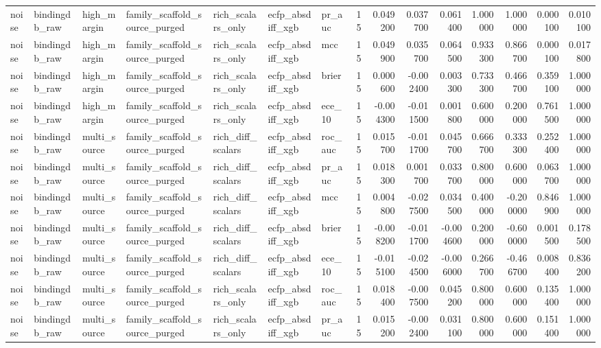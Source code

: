 \begin{longtable}{lllllllrrrrrrrr}
noise & bindingdb\_raw & high\_margin & family\_scaffold\_source\_purged & rich\_scalars\_only & ecfp\_absdiff\_xgb & pr\_auc & 15 & 0.049200 & 0.037700 & 0.061400 & 1.000000 & 1.000000 & 0.000100 & 0.010100 \\
noise & bindingdb\_raw & high\_margin & family\_scaffold\_source\_purged & rich\_scalars\_only & ecfp\_absdiff\_xgb & mcc & 15 & 0.049900 & 0.035700 & 0.064500 & 0.933300 & 0.866700 & 0.000100 & 0.017800 \\
noise & bindingdb\_raw & high\_margin & family\_scaffold\_source\_purged & rich\_scalars\_only & ecfp\_absdiff\_xgb & brier & 15 & 0.000600 & -0.002400 & 0.003300 & 0.733300 & 0.466700 & 0.359100 & 1.000000 \\
noise & bindingdb\_raw & high\_margin & family\_scaffold\_source\_purged & rich\_scalars\_only & ecfp\_absdiff\_xgb & ece\_10 & 15 & -0.004300 & -0.011500 & 0.001800 & 0.600000 & 0.200000 & 0.761500 & 1.000000 \\
noise & bindingdb\_raw & multi\_source & family\_scaffold\_source\_purged & rich\_diff\_scalars & ecfp\_absdiff\_xgb & roc\_auc & 15 & 0.015700 & -0.011700 & 0.045700 & 0.666700 & 0.333300 & 0.252400 & 1.000000 \\
noise & bindingdb\_raw & multi\_source & family\_scaffold\_source\_purged & rich\_diff\_scalars & ecfp\_absdiff\_xgb & pr\_auc & 15 & 0.018300 & 0.001700 & 0.033700 & 0.800000 & 0.600000 & 0.063700 & 1.000000 \\
noise & bindingdb\_raw & multi\_source & family\_scaffold\_source\_purged & rich\_diff\_scalars & ecfp\_absdiff\_xgb & mcc & 15 & 0.004800 & -0.027500 & 0.034500 & 0.400000 & -0.200000 & 0.846900 & 1.000000 \\
noise & bindingdb\_raw & multi\_source & family\_scaffold\_source\_purged & rich\_diff\_scalars & ecfp\_absdiff\_xgb & brier & 15 & -0.008200 & -0.011700 & -0.004600 & 0.200000 & -0.600000 & 0.001500 & 0.178500 \\
noise & bindingdb\_raw & multi\_source & family\_scaffold\_source\_purged & rich\_diff\_scalars & ecfp\_absdiff\_xgb & ece\_10 & 15 & -0.015100 & -0.024500 & -0.006000 & 0.266700 & -0.466700 & 0.008400 & 0.836200 \\
noise & bindingdb\_raw & multi\_source & family\_scaffold\_source\_purged & rich\_scalars\_only & ecfp\_absdiff\_xgb & roc\_auc & 15 & 0.018400 & -0.007500 & 0.045200 & 0.800000 & 0.600000 & 0.135400 & 1.000000 \\
noise & bindingdb\_raw & multi\_source & family\_scaffold\_source\_purged & rich\_scalars\_only & ecfp\_absdiff\_xgb & pr\_auc & 15 & 0.015200 & -0.002400 & 0.031100 & 0.800000 & 0.600000 & 0.151400 & 1.000000 \\

\end{longtable}
